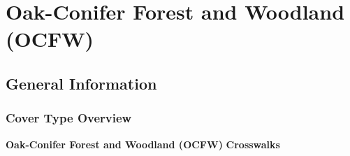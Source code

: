 \newpage
\section{Oak-Conifer Forest and Woodland (OCFW)}
\label{ocfw-description}

\subsection*{General Information}

\subsubsection*{Cover Type Overview}

\textbf{Oak-Conifer Forest and Woodland (OCFW)}
\newline
\textbf{Crosswalks}
